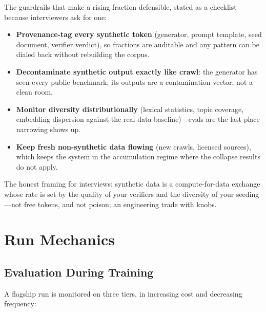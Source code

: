 The guardrails that make a rising fraction defensible, stated as a checklist because interviewers ask for one:
\begin{itemize}
    \item \textbf{Provenance-tag every synthetic token} (generator, prompt template, seed document, verifier verdict), so fractions are auditable and any pattern can be dialed back without rebuilding the corpus.
    \item \textbf{Decontaminate synthetic output exactly like crawl}: the generator has seen every public benchmark; its outputs are a contamination vector, not a clean room.
    \item \textbf{Monitor diversity distributionally} (lexical statistics, topic coverage, embedding dispersion against the real-data baseline)---evals are the last place narrowing shows up.
    \item \textbf{Keep fresh non-synthetic data flowing} (new crawls, licensed sources), which keeps the system in the accumulation regime where the collapse results do not apply.
\end{itemize}

The honest framing for interviews: synthetic data is a compute-for-data exchange whose rate is set by the quality of your verifiers and the diversity of your seeding---not free tokens, and not poison; an engineering trade with knobs.

\section{Run Mechanics}
\label{sec:pretrain_runmech}

\subsection{Evaluation During Training}

A flagship run is monitored on three tiers, in increasing cost and decreasing frequency:

